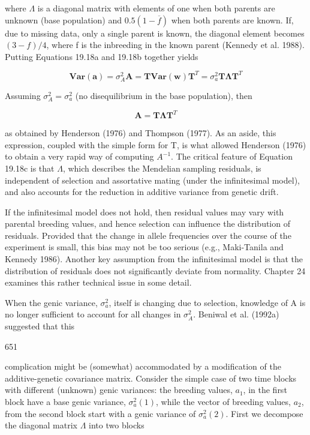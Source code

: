 \documentclass{article}
\begin{document}
where  $ \Lambda $ is a diagonal matrix with elements of one when both parents are unknown (base population) and  $ 0.5(1 - \overline{f}) $ when both parents are known. If, due to missing data, only a single parent is known, the diagonal element becomes  $ (3 - f)/4 $, where f is the inbreeding in the known parent (Kennedy et al. 1988). Putting Equations 19.18a and 19.18b together yields

\begin{equation}
\mathbf{V a r}(\mathbf{a})=\sigma_{A}^{2}\mathbf{A}=\mathbf{T}\mathbf{V a r}(\mathbf{w})\mathbf{T}^{T}=\sigma_{a}^{2}\mathbf{T}\boldsymbol{\Lambda}\mathbf{T}^{T}
\end{equation}

Assuming  $ \sigma_{A}^{2} = \sigma_{a}^{2} $ (no disequilibrium in the base population), then

\begin{equation}
\mathbf{A}=\mathbf{T}\boldsymbol{\Lambda}\mathbf{T}^{T}
\tag{19.18c}
\label{eq:19_18c}
\end{equation}

as obtained by Henderson (1976) and Thompson (1977). As an aside, this expression, coupled with the simple form for T, is what allowed Henderson (1976) to obtain a very rapid way of computing  $ A^{-1} $. The critical feature of Equation 19.18c is that  $ \Lambda $, which describes the Mendelian sampling residuals, is independent of selection and assortative mating (under the infinitesimal model), and also accounts for the reduction in additive variance from genetic drift.

If the infinitesimal model does not hold, then residual values may vary with parental breeding values, and hence selection can influence the distribution of residuals. Provided that the change in allele frequencies over the course of the experiment is small, this bias may not be too serious (e.g., Maki-Tanila and Kennedy 1986). Another key assumption from the infinitesimal model is that the distribution of residuals does not significantly deviate from normality. Chapter 24 examines this rather technical issue in some detail.

When the genic variance,  $ \sigma_{a}^{2} $, itself is changing due to selection, knowledge of A is no longer sufficient to account for all changes in  $ \sigma_{A}^{2} $. Beniwal et al. (1992a) suggested that this

651

complication might be (somewhat) accommodated by a modification of the additive-genetic covariance matrix. Consider the simple case of two time blocks with different (unknown) genic variances: the breeding values,  $ a_1 $, in the first block have a base genic variance,  $ \sigma_a^2(1) $, while the vector of breeding values,  $ a_2 $, from the second block start with a genic variance of  $ \sigma_a^2(2) $. First we decompose the diagonal matrix  $ \Lambda $ into two blocks
\end{document}
